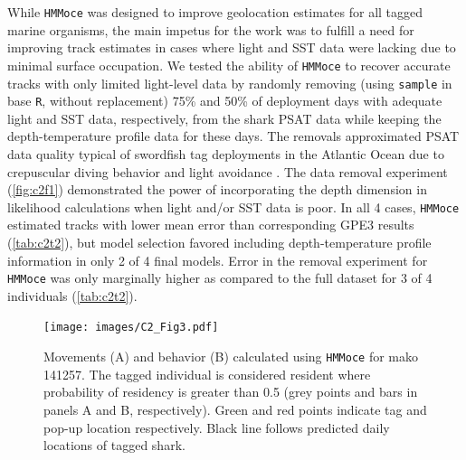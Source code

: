 While \texttt{HMMoce} was designed to improve geolocation estimates for
all tagged marine organisms, the main impetus for the work was to
fulfill a need for improving track estimates in cases where light and
SST data were lacking due to minimal surface occupation. We tested the
ability of \texttt{HMMoce} to recover accurate tracks with only limited
light-level data by randomly removing (using \texttt{sample} in base
\texttt{R}, without replacement) 75\% and 50\% of deployment days with
adequate light and SST data, respectively, from the shark PSAT data
while keeping the depth-temperature profile data for these days. The
removals approximated PSAT data quality typical of swordfish tag
deployments in the Atlantic Ocean due to crepuscular diving behavior and
light avoidance \citep{Braun2015, Neilson2009}. The data removal
experiment (\cref{fig:c2f1}) demonstrated the power of incorporating
the depth dimension in likelihood calculations when light and/or SST
data is poor. In all 4 cases, \texttt{HMMoce} estimated tracks with
lower mean error than corresponding GPE3 results (\cref{tab:c2t2}), but model
selection favored including depth-temperature profile information in
only 2 of 4 final models. Error in the removal experiment for
\texttt{HMMoce} was only marginally higher as compared to the full
dataset for 3 of 4 individuals (\cref{tab:c2t2}).

\begin{figure}[p!]
\centering
\texttt{[image: images/C2\_Fig3.pdf]}
\caption[Movement and behavior results from HMMoce]{Movements (A) and behavior (B) calculated using
\texttt{HMMoce} for mako 141257. The tagged individual is considered
resident where probability of residency is greater than 0.5 (grey points
and bars in panels A and B, respectively). Green and red points indicate
tag and pop-up location respectively. Black line follows predicted daily
locations of tagged shark.}
\label{fig:c2f3}
\end{figure}

